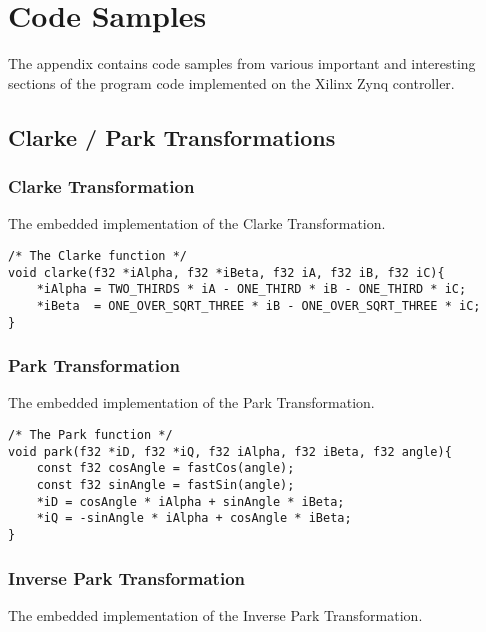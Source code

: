 \section{Code Samples}
\label{app:code_samples}
The appendix contains code samples from various important and interesting sections of the program code implemented on the Xilinx Zynq controller.

\subsection{Clarke / Park Transformations}
\subsubsection{Clarke Transformation}
\label{app:clark}
The embedded implementation of the Clarke Transformation.

\begin{lstlisting}[style=c, caption=Embedded Clarke Transformation., label=app:code:clarke]
/* The Clarke function */
void clarke(f32 *iAlpha, f32 *iBeta, f32 iA, f32 iB, f32 iC){
	*iAlpha = TWO_THIRDS * iA - ONE_THIRD * iB - ONE_THIRD * iC;
	*iBeta  = ONE_OVER_SQRT_THREE * iB - ONE_OVER_SQRT_THREE * iC;
}
\end{lstlisting}

\subsubsection{Park Transformation}
\label{app:park}
The embedded implementation of the Park Transformation.
\begin{lstlisting}[style=c, caption=Embedded Park Transformation., label=app:code:park]
/* The Park function */
void park(f32 *iD, f32 *iQ, f32 iAlpha, f32 iBeta, f32 angle){
	const f32 cosAngle = fastCos(angle);
	const f32 sinAngle = fastSin(angle);
	*iD = cosAngle * iAlpha + sinAngle * iBeta;
	*iQ = -sinAngle * iAlpha + cosAngle * iBeta;
}
\end{lstlisting}


\subsubsection{Inverse Park Transformation}
\label{app:inverse_park}
The embedded implementation of the Inverse Park Transformation.

